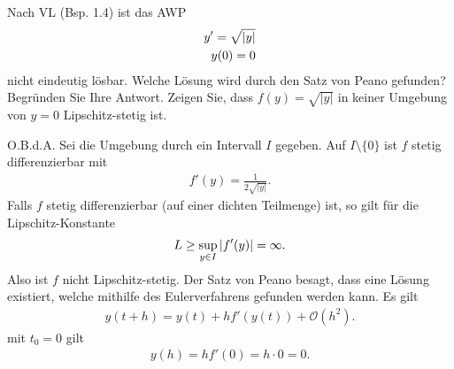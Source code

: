 \documentclass[ngerman]{report}
\begin{document}
\newpage
\begin{question}
    Nach VL (Bsp. 1.4) ist das AWP
    \begin{align*}
        y' = \sqrt{\left|y\right|}\\
        y(0) = 0
    \end{align*}
    nicht eindeutig lösbar. Welche Lösung wird durch den Satz von Peano gefunden? Begründen Sie Ihre Antwort. Zeigen Sie, dass $f (y) = \sqrt{|y|}$ in keiner Umgebung von $y = 0$ Lipschitz-stetig ist.
\end{question}
\begin{answer}
    O.B.d.A. Sei die Umgebung durch ein Intervall $I$ gegeben. Auf $I\setminus\{0\}$ ist $f$ stetig differenzierbar mit 
    \begin{align*}
        f'(y) = \frac{1}{2\sqrt{|y|}}.
    \end{align*}
    Falls $f$ stetig differenzierbar (auf einer dichten Teilmenge) ist, so gilt für die Lipschitz-Konstante
    \begin{align*}
        L \geq \sup_{y\in I} \left|f'(y)\right| = \infty.
    \end{align*}
    Also ist $f$ nicht Lipschitz-stetig. Der Satz von Peano besagt, dass eine Lösung existiert, welche mithilfe des Eulerverfahrens gefunden werden kann. Es gilt 
    \begin{align*}
        y(t+h) = y(t) + h f'(y(t)) + \mathcal{O}(h^2).
    \end{align*}
    mit $t_0 = 0$ gilt
    \begin{align*}
        y(h) = h f'(0) = h\cdot 0 = 0.
    \end{align*} 
\end{answer}
\end{document}
